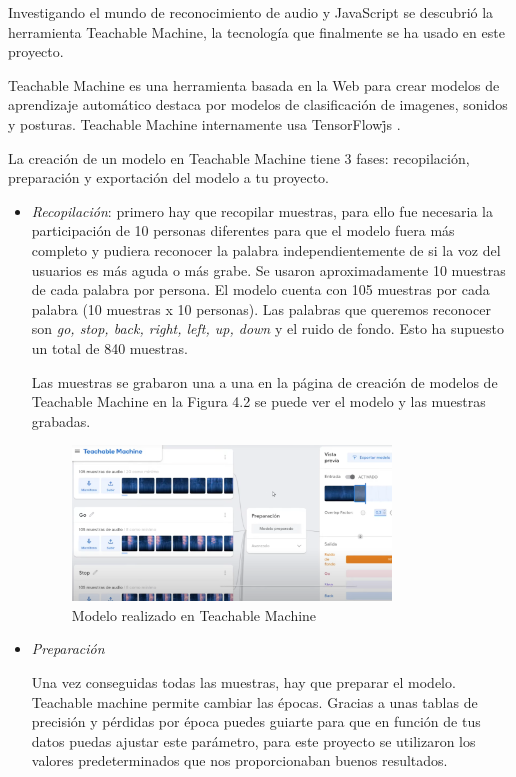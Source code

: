 Investigando el mundo de reconocimiento de audio y JavaScript se descubrió la herramienta Teachable Machine, la tecnología  que finalmente se ha usado en este proyecto.

Teachable Machine es una herramienta basada en la Web para crear modelos de aprendizaje automático destaca por modelos de clasificación de imagenes, sonidos y posturas. Teachable Machine internamente usa TensorFlow\.js . 

La creación de un modelo en Teachable Machine tiene 3 fases: recopilación, preparación y exportación del modelo a tu proyecto.

\begin{itemize}
\item \textit{Recopilación}: primero hay que recopilar muestras, para ello fue necesaria la participación de 10 personas diferentes para que el modelo fuera más completo y pudiera reconocer la palabra independientemente de si la voz del usuarios  es más aguda o más grabe.  Se usaron aproximadamente 10 muestras de cada palabra por persona. El modelo cuenta con 105 muestras por cada palabra (10 muestras x 10 personas). Las palabras que queremos reconocer son \textit{go, stop, back, right, left, up, down } y el ruido de fondo. Esto ha supuesto un total de 840 muestras.

Las muestras se grabaron una a una en la página de creación de modelos de Teachable Machine en la Figura 4.2 se puede ver el modelo y las muestras grabadas.


\begin{figure}[H]
 \centering
    \includegraphics[width=0.8\textwidth, height=0.4\textwidth]{chapters/images/teachablemachine.png}
    \caption{Modelo realizado en Teachable Machine}
\end{figure}
 


\item  \textit{Preparación}

Una vez conseguidas todas las muestras, hay que preparar el modelo. Teachable machine permite cambiar las épocas. Gracias a unas tablas de precisión y pérdidas por época puedes guiarte para  que en función de tus datos puedas ajustar este parámetro, para este proyecto se utilizaron los valores predeterminados que nos proporcionaban  buenos resultados.



\end{itemize}
